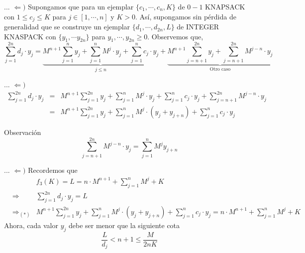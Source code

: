 \begin{frame}{...}
   $\Leftarrow )$  Supongamos que para un ejemplar $\{c_1, \dotsm, c_n, K\}$ de $0-1$ KNAPSACK con $1 \leq c_j \leq K$ para
  $j \in  [1, \dotsm, n]$ y $K > 0$. Así, supongamos sin pérdida de generalidad que se construye un ejemplar
  $\{d_1, \dotsm, d_{2n}, L\}$ de INTEGER KNASPACK con $\{y_1, \dotsm y_{2n}\}$ para $y_1, \dotsm, y_{2n} \geq 0$.
  Observemos que,
  \[\sum_{j = 1}^{2n}d_j \cdot y_j  =
  \underbrace{M^{n + 1}\sum_{j = 1}^{n}y_j + \sum_{j = 1}^{n}M^j \cdot y_j + \sum_{j = 1}^{n}c_j \cdot y_j}_{j \leq n}
  + \underbrace{M^{n + 1} \sum_{j = n + 1}^{2n} y_j + \sum_{j = n + 1}^{2n}M^{j - n} \cdot y_{j}}_{\text{Otro caso}}\]  
\end{frame}

\begin{frame}{...}
  $\Leftarrow )$ 
  \begin{eqnarray*}
  \sum_{j = 1}^{2n}d_j \cdot y_j  &=&
  M^{n + 1}\sum_{j = 1}^{2n}y_j + \sum_{j = 1}^{n}M^j \cdot y_j + \sum_{j = 1}^{n}c_j \cdot y_j
  + \sum_{j = n + 1}^{2n}M^{j - n} \cdot y_{j}\\
  &=&
  M^{n + 1}\sum_{j = 1}^{2n}y_j + \sum_{j = 1}^{n}M^j \cdot (y_j + y_{j + n}) + \sum_{j = 1}^{n}c_j \cdot y_j
  \end{eqnarray*}
  \begin{block}{Observación}
    \[\sum_{j = n + 1}^{2n}M^{j - n} \cdot y_j = \sum_{j = 1}^{n}M^{j}y_{j+ n}\]
  \end{block}
\end{frame}

\begin{frame}{...}
  $\Leftarrow )$ \newline
  Recordemos que
  \begin{eqnarray*}
    & & f_3(K) = L = n \cdot M^{n + 1} + \sum_{j = 1}^{n}M^j + K\\
    &\Rightarrow& \sum_{j = 1}^{2n}d_j \cdot y_j = L\\
    &\Rightarrow_{(*)}& M^{n + 1}\sum_{j = 1}^{2n}y_j + \sum_{j = 1}^{n}M^j \cdot (y_j + y_{j + n})
    + \sum_{j = 1}^{n}c_j \cdot y_j = n \cdot M^{n + 1} + \sum_{j = 1}^{n}M^j + K
  \end{eqnarray*}
  Ahora, cada valor $y_j$ debe ser menor que la siguiente cota
  \[\frac{L}{d_j} < n + 1 \leq \frac{M}{2nK}\]
\end{frame}

